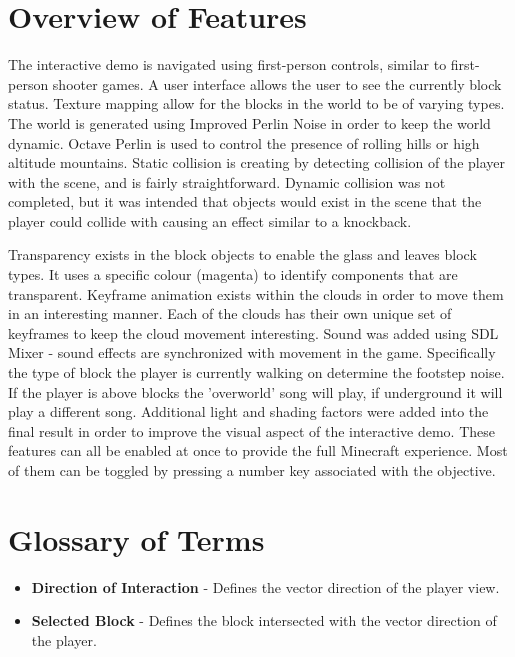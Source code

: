 \documentclass{book}
\begin{document}
\section{Overview of Features}
The interactive demo is navigated using first-person controls, similar to first-person shooter games.
A user interface allows the user to see the currently block status.  Texture mapping allow for the blocks in the world to be of varying types.  The world is generated using Improved Perlin Noise in order to keep the world dynamic.  Octave Perlin is used to control the presence of rolling hills or high altitude mountains.  Static collision is creating by detecting collision of the player with the scene, and is fairly straightforward.  Dynamic collision was not completed, but it was intended that objects would exist in the scene that the player could collide with causing an effect similar to a knockback.  

Transparency exists in the block objects to enable the glass and leaves block types.  It uses a specific colour (magenta) to identify components that are transparent.  Keyframe animation exists within the clouds in order to move them in an interesting manner.  Each of the clouds has their own unique set of keyframes to keep the cloud movement interesting.  Sound was added using SDL Mixer - sound effects are synchronized with movement in the game.  Specifically the type of block the player is currently walking on determine the footstep noise.  If the player is above blocks the 'overworld' song will play, if underground it will play a different song. Additional light and shading factors were added into the final result in order to improve the visual aspect of the interactive demo.  These features can all be enabled at once to provide the full Minecraft experience. Most of them can be toggled by pressing a number key associated with the objective. 

\section{Glossary of Terms}
\begin{itemize}
\item \textbf{Direction of Interaction} - Defines the vector direction of the player view.
\item \textbf{Selected Block} - Defines the block intersected with the vector direction of the player.
\end{itemize}

\end{document}

